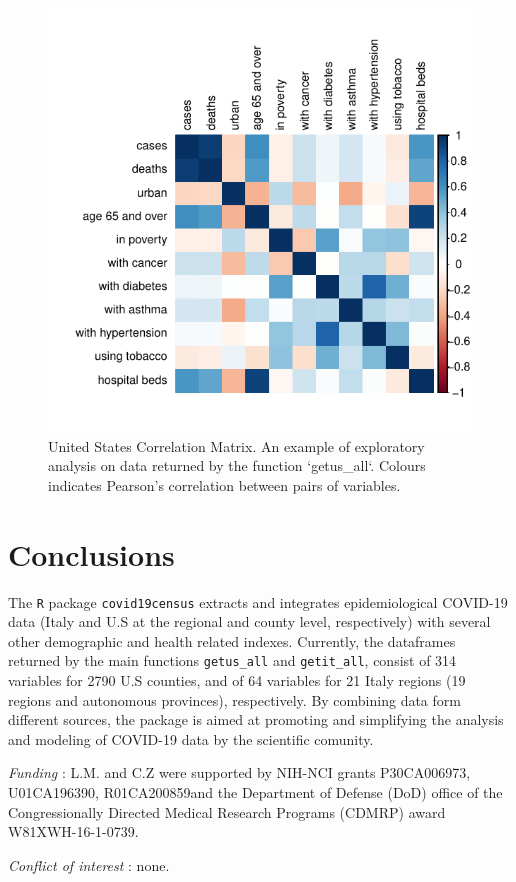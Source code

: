 \documentclass[12pt,halfline,a4paper,]{ouparticle}
\begin{document}
\begin{figure}[p]
\includegraphics[width=1\linewidth]{draft_files/figure-latex/fig_corr-1} \caption{United States Correlation Matrix. An example of exploratory analysis on data returned by the function `getus\_all`. Colours indicates Pearson's correlation between pairs of variables.}\label{fig:fig_corr}
\end{figure}

\hypertarget{conclusions}{%
\section{Conclusions}\label{conclusions}}

The \texttt{R} package \texttt{covid19census} extracts and integrates
epidemiological COVID-19 data (Italy and U.S at the regional and county
level, respectively) with several other demographic and health related
indexes. Currently, the dataframes returned by the main functions
\texttt{getus\_all} and \texttt{getit\_all}, consist of 314 variables
for 2790 U.S counties, and of 64 variables for 21 Italy regions (19
regions and autonomous provinces), respectively. By combining data form
different sources, the package is aimed at promoting and simplifying the
analysis and modeling of COVID-19 data by the scientific comunity.


\begin{notes}[Acknowledgements]
\emph{Funding} : L.M. and C.Z were supported by NIH-NCI grants
P30CA006973, U01CA196390, R01CA200859and the Department of Defense (DoD)
office of the Congressionally Directed Medical Research Programs (CDMRP)
award W81XWH-16-1-0739.

\emph{Conflict of interest} : none.
\end{notes}


\renewcommand\refname{References}


\end{document}
